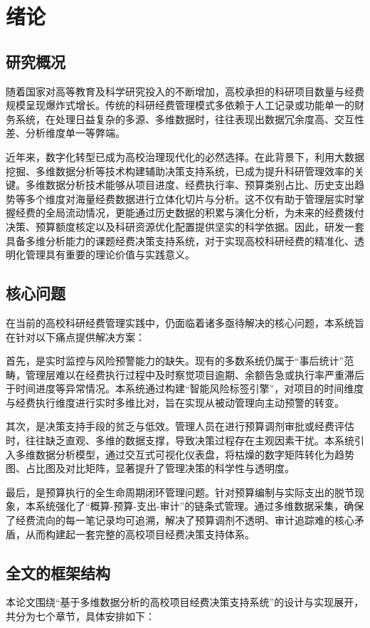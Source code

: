 \chapter{绪论}

\section{研究概况}
随着国家对高等教育及科学研究投入的不断增加，高校承担的科研项目数量与经费规模呈现爆炸式增长。传统的科研经费管理模式多依赖于人工记录或功能单一的财务系统，在处理日益复杂的多源、多维数据时，往往表现出数据冗余度高、交互性差、分析维度单一等弊端。

近年来，数字化转型已成为高校治理现代化的必然选择。在此背景下，利用大数据挖掘、多维数据分析等技术构建辅助决策支持系统，已成为提升科研管理效率的关键。多维数据分析技术能够从项目进度、经费执行率、预算类别占比、历史支出趋势等多个维度对海量经费数据进行立体化切片与分析。这不仅有助于管理层实时掌握经费的全局流动情况，更能通过历史数据的积累与演化分析，为未来的经费拨付决策、预算额度核定以及科研资源优化配置提供坚实的科学依据。因此，研发一套具备多维分析能力的课题经费决策支持系统，对于实现高校科研经费的精准化、透明化管理具有重要的理论价值与实践意义。

\section{核心问题}
在当前的高校科研经费管理实践中，仍面临着诸多亟待解决的核心问题，本系统旨在针对以下痛点提供解决方案：

首先，是实时监控与风险预警能力的缺失。现有的多数系统仍属于“事后统计”范畴，管理层难以在经费执行过程中及时察觉项目逾期、余额告急或执行率严重滞后于时间进度等异常情况。本系统通过构建“智能风险标签引擎”，对项目的时间维度与经费执行维度进行实时多维比对，旨在实现从被动管理向主动预警的转变。

其次，是决策支持手段的贫乏与低效。管理人员在进行预算调剂审批或经费评估时，往往缺乏直观、多维的数据支撑，导致决策过程存在主观因素干扰。本系统引入多维数据分析模型，通过交互式可视化仪表盘，将枯燥的数字矩阵转化为趋势图、占比图及对比矩阵，显著提升了管理决策的科学性与透明度。

最后，是预算执行的全生命周期闭环管理问题。针对预算编制与实际支出的脱节现象，本系统强化了“概算-预算-支出-审计”的链条式管理。通过多维数据采集，确保了经费流向的每一笔记录均可追溯，解决了预算调剂不透明、审计追踪难的核心矛盾，从而构建起一套完整的高校项目经费决策支持体系。

\section{全文的框架结构}
本论文围绕“基于多维数据分析的高校项目经费决策支持系统”的设计与实现展开，共分为七个章节，具体安排如下：

